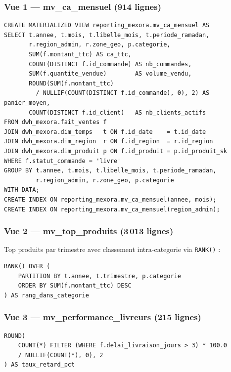 \documentclass[12pt,a4paper]{article}
\begin{document}
\subsubsection{Vue 1 --- mv\_ca\_mensuel (914 lignes)}

\begin{lstlisting}[style=sql, caption=Vue materialisee -- CA mensuel par region et categorie]
CREATE MATERIALIZED VIEW reporting_mexora.mv_ca_mensuel AS
SELECT t.annee, t.mois, t.libelle_mois, t.periode_ramadan,
       r.region_admin, r.zone_geo, p.categorie,
       SUM(f.montant_ttc) AS ca_ttc,
       COUNT(DISTINCT f.id_commande) AS nb_commandes,
       SUM(f.quantite_vendue)        AS volume_vendu,
       ROUND(SUM(f.montant_ttc)
         / NULLIF(COUNT(DISTINCT f.id_commande), 0), 2) AS panier_moyen,
       COUNT(DISTINCT f.id_client)   AS nb_clients_actifs
FROM dwh_mexora.fait_ventes f
JOIN dwh_mexora.dim_temps   t ON f.id_date    = t.id_date
JOIN dwh_mexora.dim_region  r ON f.id_region  = r.id_region
JOIN dwh_mexora.dim_produit p ON f.id_produit = p.id_produit_sk
WHERE f.statut_commande = 'livre'
GROUP BY t.annee, t.mois, t.libelle_mois, t.periode_ramadan,
         r.region_admin, r.zone_geo, p.categorie
WITH DATA;
CREATE INDEX ON reporting_mexora.mv_ca_mensuel(annee, mois);
CREATE INDEX ON reporting_mexora.mv_ca_mensuel(region_admin);
\end{lstlisting}

\subsubsection{Vue 2 --- mv\_top\_produits (3\,013 lignes)}

Top produits par trimestre avec classement intra-categorie via \texttt{RANK()} :

\begin{lstlisting}[style=sql, caption=Vue materialisee -- Top produits par trimestre]
RANK() OVER (
    PARTITION BY t.annee, t.trimestre, p.categorie
    ORDER BY SUM(f.montant_ttc) DESC
) AS rang_dans_categorie
\end{lstlisting}

\subsubsection{Vue 3 --- mv\_performance\_livreurs (215 lignes)}

\begin{lstlisting}[style=sql, caption=Vue materialisee -- Taux de retard par livreur]
ROUND(
    COUNT(*) FILTER (WHERE f.delai_livraison_jours > 3) * 100.0
    / NULLIF(COUNT(*), 0), 2
) AS taux_retard_pct
\end{lstlisting}
\end{document}
